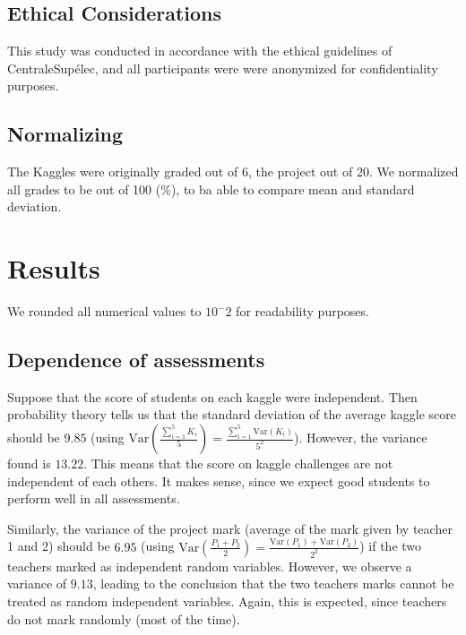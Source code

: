 \documentclass[a4paper]{article}
\newcommand{\Var}[1]{\text{Var}\left( {#1} \right)}
\begin{document}
	\subsection{Ethical Considerations}
	This study was conducted in accordance with the ethical guidelines of CentraleSupélec, and all participants were were anonymized for confidentiality purposes.
	
	\subsection{Normalizing}
	The Kaggles were originally graded out of 6, the project out of 20.
	We normalized all grades to be out of 100 (\%), to ba able to compare mean and standard deviation.
	
	\section{Results}
	We rounded all numerical values to $10^-2$ for readability purposes.
	\subsection{Dependence of assessments}
	Suppose that the score of students on each kaggle were independent.
	Then probability theory tells us that the standard deviation of the average kaggle score should be $9.85$ (using $\Var{\frac{\sum_{i=1}^{5} K_i}{5}} = \frac{\sum_{i=1}^{5} \Var{K_i}}{5^2}$).
	However, the variance found is $13.22$.
	This means that the score on kaggle challenges are not independent of each others.
	It makes sense, since we expect good students to perform well in all assessments.
	
	Similarly, the variance of the project mark (average of the mark given by teacher 1 and 2) should be $6.95$ (using $\Var{\frac{P_1 + P_2}{2}} = \frac{\Var{P_1} + \Var{P_2}}{2^2}$) if the two teachers marked as independent random variables.
	However, we observe a variance of $9.13$, leading to the conclusion that the two teachers marks cannot be treated as random independent variables.
	Again, this is expected, since teachers do not mark randomly (most of the time).
	
\end{document}
